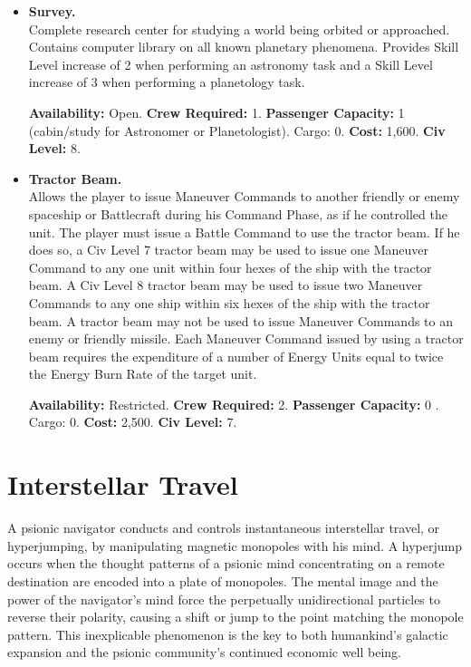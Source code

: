 \begin{itemize}
  

\item\textbf{Survey.}\\
  Complete research center for studying a world being orbited or
  approached. Contains computer library on all known planetary
  phenomena. Provides Skill Level increase of 2 when performing an
  astronomy task and a Skill Level increase of 3 when performing a
  planetology task.

  
  \textbf{Availability:} Open. \textbf{Crew Required:} 1.
  \textbf{Passenger Capacity:} 1 (cabin/study for Astronomer or
  Planetologist). Cargo: 0. \textbf{Cost:} 1,600.  \textbf{Civ Level:}
  8.
  
  

\item\textbf{Tractor Beam.}\\
  Allows the player to issue Maneuver Commands to another friendly or
  enemy spaceship or Battlecraft during his Command Phase, as if he
  controlled the unit. The player must issue a Battle Command to use
  the tractor beam. If he does so, a Civ Level 7 tractor beam may be
  used to issue one Maneuver Command to any one unit within four hexes
  of the ship with the tractor beam. A Civ Level 8 tractor beam may be
  used to issue two Maneuver Commands to any one ship within six hexes
  of the ship with the tractor beam. A tractor beam may not be used to
  issue Maneuver Commands to an enemy or friendly missile. Each
  Maneuver Command issued by using a tractor beam requires the
  expenditure of a number of Energy Units equal to twice the Energy
  Burn Rate of the target unit.

  
  \textbf{Availability:} Restricted. \textbf{Crew Required:} 2.
  \textbf{Passenger Capacity:} 0 .  Cargo: 0. \textbf{Cost:} 2,500.
  \textbf{Civ Level:} 7.
\end{itemize}

\section{Interstellar Travel}
\label{sec:interstellar-travel}



A psionic navigator conducts and controls instantaneous interstellar
travel, or hyperjumping, by manipulating magnetic monopoles with his
mind. A hyperjump occurs when the thought patterns of a psionic mind
concentrating on a remote destination are encoded into a plate of
monopoles. The mental image and the power of the navigator's mind
force the perpetually unidirectional particles to reverse their
polarity, causing a shift or jump to the point matching the monopole
pattern. This inexplicable phenomenon is the key to both humankind's
galactic expansion and the psionic community's continued economic well
being.

